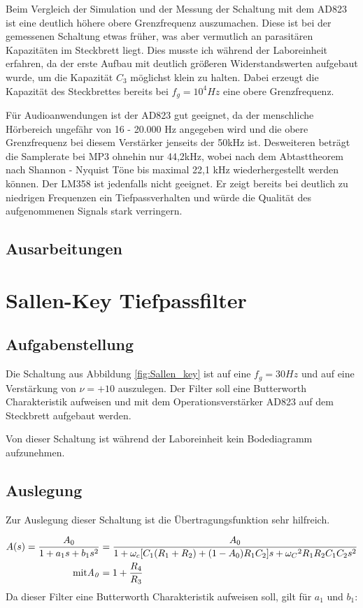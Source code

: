 Beim Vergleich der Simulation und der Messung der Schaltung mit dem AD823 ist eine deutlich höhere obere Grenzfrequenz auszumachen. Diese ist bei der gemessenen Schaltung etwas früher, was aber vermutlich an parasitären Kapazitäten im Steckbrett liegt. Dies musste ich während der Laboreinheit erfahren, da der erste Aufbau mit deutlich größeren Widerstandswerten aufgebaut wurde, um die Kapazität $C_3$ möglichst klein zu halten. Dabei erzeugt die Kapazität des Steckbrettes bereits bei $f_g=10^4Hz$ eine obere Grenzfrequenz. 

Für Audioanwendungen ist der AD823 gut geeignet, da der menschliche Hörbereich ungefähr von 16 - 20.000 Hz angegeben wird und die obere Grenzfrequenz bei diesem Verstärker jenseits der 50kHz ist.  Desweiteren beträgt die Samplerate bei MP3 ohnehin nur 44,2kHz, wobei nach dem Abtasttheorem nach Shannon - Nyquist Töne bis maximal 22,1 kHz wiederhergestellt werden können. Der LM358 ist jedenfalls nicht geeignet. Er zeigt bereits bei deutlich zu niedrigen Frequenzen ein Tiefpassverhalten und würde die Qualität des aufgenommenen Signals stark verringern. 
\subsection{Ausarbeitungen}

\section{Sallen-Key Tiefpassfilter}
\subsection{Aufgabenstellung}
Die Schaltung aus Abbildung \ref{fig:Sallen_key} ist auf eine $f_g=30Hz$ und auf eine Verstärkung von $\nu = +10$ auszulegen. Der Filter soll eine Butterworth Charakteristik aufweisen und mit dem Operationsverstärker AD823 auf dem Steckbrett aufgebaut werden.

Von dieser Schaltung ist während der Laboreinheit kein Bodediagramm aufzunehmen. 


\subsection{Auslegung}
Zur Auslegung dieser Schaltung ist die Übertragungsfunktion \cite[212]{10.5555/3158302} sehr hilfreich.

\begin{align}
    A(s) = \frac{A_0}{1+a_1s + b_1s^2}&=\frac{A_0}{1+\omega_c[C_1(R_1+R_2) + (1-A_0)R_1C_2]s + {\omega_C}^2R_1R_2C_1C_2s^2} \\
    \rm mit \it A_0 &= 1+ \frac{R_4}{R_3} 
\end{align}
Da dieser Filter eine Butterworth Charakteristik aufweisen soll, gilt für $a_1$ und $b_1$:


